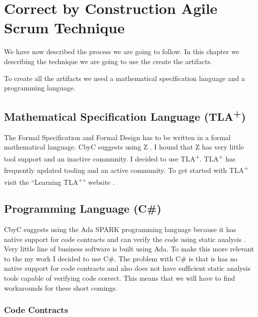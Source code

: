 
\chapter{Correct by Construction Agile Scrum Technique} %

\label{Chapter_Applying_the_methodology} %

We have now described the process we are going to follow. In this chapter we
describing the technique we are going to use the create the artifacts.

To create all the artifacts we need a mathematical specification language
and a programming language.

\section{Mathematical Specification Language (TLA\textsuperscript{+})}

The Formal Specification and Formal Design has to be written in a formal
mathematical language. CbyC suggests using Z  \parencite{CbyCPraxis}. 
I hound that Z has very little tool support and an inactive community. I decided
to use TLA\textsuperscript{+}.  TLA\textsuperscript{+} has frequently updated 
tooling and an active community. To get started with TLA\textsuperscript{+}
visit the ``Learning TLA\textsuperscript{+}'' website \parencite{LearningTLA}.

\section{Programming Language (C\#)}

CbyC suggests using the Ada SPARK programming language because it has native
support for code contracts and can verify the code using static analysis \parencite{CbyCPraxis}.
Very little line of business software is built using Ada. To make this more relevant 
to the my work I decided to use C\#. The problem with C\# is that is has no native
support for code contracts and also does not have sufficient static analysis tools 
capable of verifying code correct. This means that we will have to find workarounds
for these short comings. 

\subsection{Code Contracts}

